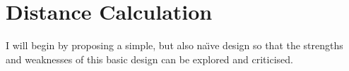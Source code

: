 \section{Distance Calculation}
\label{hardware:designs:distanceCalculation}
I will begin by proposing a simple, but also na\"{\i}ve design so that the
strengths and weaknesses of this basic design can be explored and criticised.